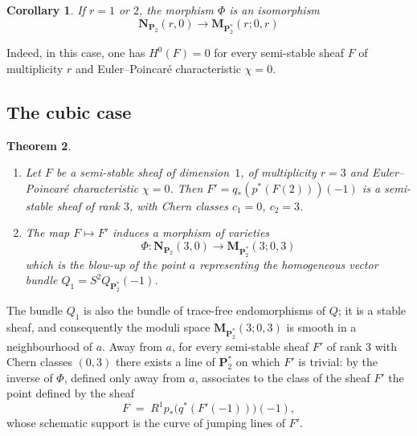 \documentclass[12pt,english]{smfart}%
\theoremstyle{plain}
\newtheorem{theorem}{Theorem}[section]
\newtheorem{corollary}[theorem]{Corollary}
\theoremstyle{definition}
\theoremstyle{remark}
\newcommand{\PP}{\mathbf{P}}
\newcommand{\Pd}{\PP_{2}^{*}}          %
\newcommand{\MM}{\mathbf{M}}           %
\newcommand{\origpage}[1]{\marginnote{\scriptsize\itshape p.~#1}}
\begin{document}
\begin{corollary}\label{cor:r12}
If $r=1$ or $2$, the morphism $\Phi$ is an isomorphism
\[
\mathbf{N}_{\PP_{2}}(r,0) \longrightarrow \mathbf{M}_{\PP_{2}^{*}}(r;0,r)
\]
\end{corollary}

Indeed, in this case, one has $H^{0}(F)=0$ for every semi-stable sheaf $F$ of multiplicity $r$ and Euler--Poincar\'e characteristic $\chi=0$.

\subsection{The cubic case}\label{subsec:cubic}

\begin{theorem}\label{thm:cubic}
\begin{enumerate}
\item[(1)] Let $F$ be a semi-stable sheaf of dimension~$1$, of multiplicity $r=3$ and Euler--Poincar\'e characteristic $\chi=0$. Then $F'=q_{*}(p^{*}(F(2)))(-1)$ is a semi-stable sheaf of rank $3$, with Chern classes $c_{1}=0$, $c_{2}=3$.
\item[(2)] The map $F\mapsto F'$ induces a morphism of varieties
\[
\Phi : \mathbf{N}_{\PP_{2}}(3,0) \longrightarrow \mathbf{M}_{\PP_{2}^{*}}(3;0,3)
\]
which is the blow-up of the point $a$ representing the homogeneous vector bundle $Q_{1}=S^{2}Q_{\PP_{2}^{*}}(-1)$.
\end{enumerate}
\end{theorem}

\origpage{659}%
The bundle $Q_1$ is also the bundle of trace-free endomorphisms of $Q$; it is a stable sheaf, and consequently the moduli space $\MM_{\Pd}(3;0,3)$ is smooth in a neighbourhood of $a$. Away from $a$, for every semi-stable sheaf $F'$ of rank $3$ with Chern classes $(0,3)$ there exists a line of $\Pd$ on which $F'$ is trivial: by  the inverse of $\Phi$, defined only away from $a$, associates to the class of the sheaf $F'$ the point defined by the sheaf
\[
F \;=\; R^1p_*\bigl(q^*(F'(-1))\bigr)(-1),
\]
whose schematic support is the curve of jumping lines of $F'$.
\end{document}
